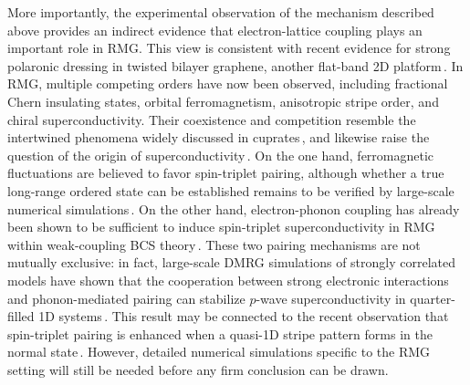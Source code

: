 \documentclass[aps,prx,article,twocolumn,amsmath,amssymb,superscriptaddress,longbibliography]{revtex4-2}
\begin{document}
More importantly, the experimental observation of the mechanism described above provides an indirect evidence that electron-lattice coupling plays an important role in RMG. This view is consistent with recent evidence for strong polaronic dressing in twisted bilayer graphene, another flat-band 2D platform\,\cite{chen2024strong,li2024evolution,birkbeck2025quantum}. In RMG, multiple competing orders have now been observed, including fractional Chern insulating states, orbital ferromagnetism, anisotropic stripe order, and chiral superconductivity. Their coexistence and competition resemble the intertwined phenomena widely discussed in cuprates\,\cite{fradkin2015colloquium, davis2013concepts, ghiringhelli2012long, arpaia2019dynamical, comin2015symmetry, lee2020spectroscopic}, and likewise raise the question of the origin of superconductivity\,\cite{jiang2019superconductivity, chung2020plaquette}. On the one hand, ferromagnetic fluctuations are believed to favor spin-triplet pairing, although whether a true long-range ordered state can be established remains to be verified by large-scale numerical simulations\,\cite{xu2024coexistence, jiang2021ground}. On the other hand, electron-phonon coupling has already been shown to be sufficient to induce spin-triplet superconductivity in RMG within weak-coupling BCS theory\,\cite{zan2024electron}. These two pairing mechanisms are not mutually exclusive: in fact, large-scale DMRG simulations of strongly correlated models have shown that the cooperation between strong electronic interactions and phonon-mediated pairing can stabilize $p$-wave superconductivity in quarter-filled 1D systems\,\cite{qu2022spin}. This result may be connected to the recent observation that spin-triplet pairing is enhanced when a quasi-1D stripe pattern forms in the normal state\,\cite{qin2025extreme}. However, detailed numerical simulations specific to the RMG setting will still be needed before any firm conclusion can be drawn.
\end{document}
